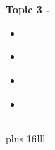 \documentclass[fleqn]{beamer} %
\newcommand{\sectionIIItitle}{}
\newcommand{\sectionIIIsubsectionItitle}{}
\newcommand{\sectionIIIsubsectionIItitle}{}
\newcommand{\sectionIIIsubsectionIIItitle}{}
\newcommand{\sectionIIIsubsectionIVtitle}{}
\newcommand{\btVFill}{\vskip0pt plus 1filll}
\begin{document}
	\section{\sectionIIItitle}\label{sectionIII}

		\begin{frame}
			\large \textbf{Topic 3 - \sectionIIItitle} \vspace{3mm}\\

			\begin{itemize}
				\item \hyperlink{sectionIIIsubsectionI}{\sectionIIIsubsectionItitle} \vspc %
				\item \hyperlink{sectionIIIsubsectionII}{\sectionIIIsubsectionIItitle} \vspc %
				\item \hyperlink{sectionIIIsubsectionIII}{\sectionIIIsubsectionIIItitle} \vspc %
				\item \hyperlink{sectionIIIsubsectionIV}{\sectionIIIsubsectionIVtitle} \vspc %
			\end{itemize}

		\end{frame}

		\subsection{\sectionIIIsubsectionItitle}\label{sectionIIIsubsectionI}

			\begin{frame}
				\frametitle{\sectionIIIsubsectionItitle}

				\bigskip

				
			
				\btVFill
			

			\end{frame}

			\begin{frame}
				\frametitle{\sectionIIIsubsectionItitle}
		
			\end{frame}

		\subsection{\sectionIIIsubsectionIItitle}\label{sectionIIIsubsectionII}	
\end{document}
